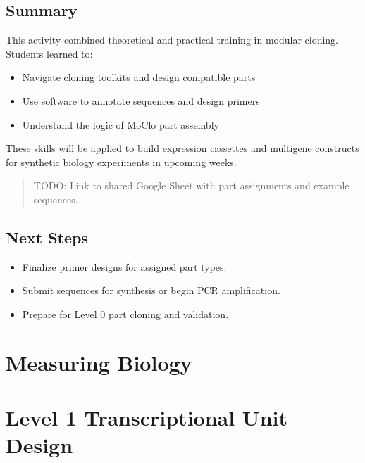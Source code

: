 \documentclass[
  letterpaper,
  DIV=11,
  numbers=noendperiod]{scrreprt}
\providecommand{\tightlist}{%
  \setlength{\itemsep}{0pt}\setlength{\parskip}{0pt}}\usepackage{longtable,booktabs,array}
\begin{document}
\section{Summary}\label{summary-1}

This activity combined theoretical and practical training in modular
cloning. Students learned to:

\begin{itemize}
\tightlist
\item
  Navigate cloning toolkits and design compatible parts
\item
  Use software to annotate sequences and design primers
\item
  Understand the logic of MoClo part assembly
\end{itemize}

These skills will be applied to build expression cassettes and multigene
constructs for synthetic biology experiments in upcoming weeks.

\begin{quote}
TODO: Link to shared Google Sheet with part assignments and example
sequences.
\end{quote}

\section{Next Steps}\label{next-steps-1}

\begin{itemize}
\tightlist
\item
  Finalize primer designs for assigned part types.
\item
  Submit sequences for synthesis or begin PCR amplification.
\item
  Prepare for Level 0 part cloning and validation.
\end{itemize}


\chapter{Measuring Biology}\label{measuring-biology}


\chapter{Level 1 Transcriptional Unit
Design}\label{level-1-transcriptional-unit-design}
\end{document}
